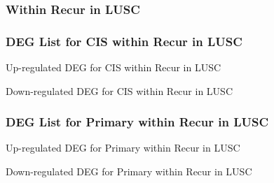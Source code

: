 \documentclass{beamer}
\begin{document}
    \subsubsection{Within Recur in LUSC}
    \begin{frame}
        \frametitle{DEG List for CIS within Recur in LUSC}

        \begin{table}
            \caption{Up-regulated DEG for CIS within Recur in LUSC}
            
        \end{table}

        \begin{table}
            \caption{Down-regulated DEG for CIS within Recur in LUSC}
            
        \end{table}
    \end{frame}

    \begin{frame}
        \frametitle{DEG List for Primary within Recur in LUSC}

        \begin{table}
            \caption{Up-regulated DEG for Primary within Recur in LUSC}
            
        \end{table}

        \begin{table}
            \caption{Down-regulated DEG for Primary within Recur in LUSC}
            
        \end{table}
    \end{frame}
\end{document}
